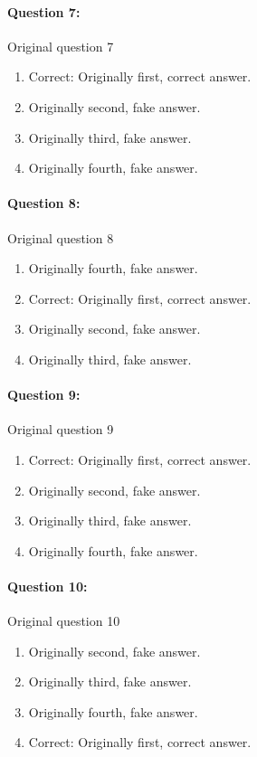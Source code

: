 \documentclass[9pt, twoside, twocolumn]{extarticle}
\begin{document}
\paragraph{Question 7:}
Original question 7

\begin{enumerate}[label=\textbf{{\Alph*}},labelindent=0pt, labelsep=1.5em, parsep=0.2em]
\item Correct: Originally first, correct answer.
\item Originally second, fake answer.
\item Originally third, fake answer.
\item Originally fourth, fake answer.
\end{enumerate}
\paragraph{Question 8:}
Original question 8

\begin{enumerate}[label=\textbf{{\Alph*}},labelindent=0pt, labelsep=1.5em, parsep=0.2em]
\item Originally fourth, fake answer.
\item Correct: Originally first, correct answer.
\item Originally second, fake answer.
\item Originally third, fake answer.
\end{enumerate}
\paragraph{Question 9:}
Original question 9

\begin{enumerate}[label=\textbf{{\Alph*}},labelindent=0pt, labelsep=1.5em, parsep=0.2em]
\item Correct: Originally first, correct answer.
\item Originally second, fake answer.
\item Originally third, fake answer.
\item Originally fourth, fake answer.
\end{enumerate}
\paragraph{Question 10:}
Original question 10

\begin{enumerate}[label=\textbf{{\Alph*}},labelindent=0pt, labelsep=1.5em, parsep=0.2em]
\item Originally second, fake answer.
\item Originally third, fake answer.
\item Originally fourth, fake answer.
\item Correct: Originally first, correct answer.
\end{enumerate}
\cleardoublepage
\newpage
\end{document}
